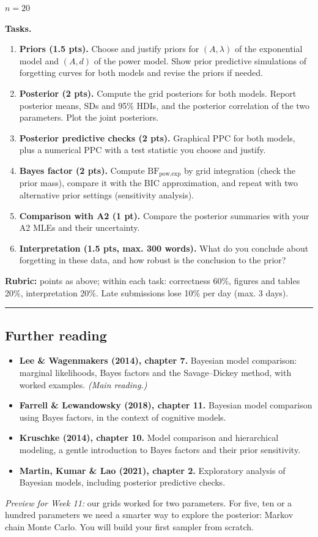\(n = 20\)

\textbf{Tasks.}

\begin{enumerate}
\def\labelenumi{\arabic{enumi}.}
\tightlist
\item
  \textbf{Priors (1.5 pts).} Choose and justify priors for
  \((A, \lambda)\) of the exponential model and \((A, d)\) of the power
  model. Show prior predictive simulations of forgetting curves for both
  models and revise the priors if needed.
\item
  \textbf{Posterior (2 pts).} Compute the grid posteriors for both
  models. Report posterior means, SDs and 95\% HDIs, and the posterior
  correlation of the two parameters. Plot the joint posteriors.
\item
  \textbf{Posterior predictive checks (2 pts).} Graphical PPC for both
  models, plus a numerical PPC with a test statistic you choose and
  justify.
\item
  \textbf{Bayes factor (2 pts).} Compute
  \(\mathrm{BF}_{\text{pow,exp}}\) by grid integration (check the prior
  mass), compare it with the BIC approximation, and repeat with two
  alternative prior settings (sensitivity analysis).
\item
  \textbf{Comparison with A2 (1 pt).} Compare the posterior summaries
  with your A2 MLEs and their uncertainty.
\item
  \textbf{Interpretation (1.5 pts, max. 300 words).} What do you
  conclude about forgetting in these data, and how robust is the
  conclusion to the prior?
\end{enumerate}

\textbf{Rubric:} points as above; within each task: correctness 60\%,
figures and tables 20\%, interpretation 20\%. Late submissions lose 10\%
per day (max. 3 days).

\begin{center}\rule{0.5\linewidth}{0.5pt}\end{center}

\subsection{Further reading}

\begin{itemize}
\tightlist
\item
  \textbf{Lee \& Wagenmakers (2014), chapter 7.} Bayesian model
  comparison: marginal likelihoods, Bayes factors and the Savage--Dickey
  method, with worked examples. \emph{(Main reading.)}
\item
  \textbf{Farrell \& Lewandowsky (2018), chapter 11.} Bayesian model
  comparison using Bayes factors, in the context of cognitive models.
\item
  \textbf{Kruschke (2014), chapter 10.} Model comparison and
  hierarchical modeling, a gentle introduction to Bayes factors and
  their prior sensitivity.
\item
  \textbf{Martin, Kumar \& Lao (2021), chapter 2.} Exploratory analysis
  of Bayesian models, including posterior predictive checks.
\end{itemize}

\emph{Preview for Week 11:} our grids worked for two parameters. For
five, ten or a hundred parameters we need a smarter way to explore the
posterior: Markov chain Monte Carlo. You will build your first sampler
from scratch.
